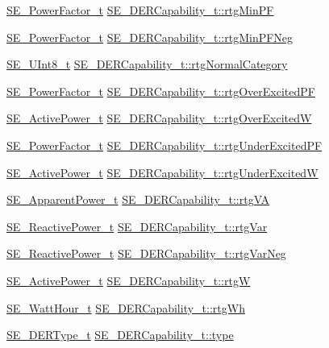 \begin{DoxyCompactItemize}
\item 
\hyperlink{structSE__PowerFactor__t}{S\+E\+\_\+\+Power\+Factor\+\_\+t} \hyperlink{group__DERCapability_ga72727afdb49427d03d3d113d0d2d6bf5}{S\+E\+\_\+\+D\+E\+R\+Capability\+\_\+t\+::rtg\+Min\+PF}
\item 
\hyperlink{structSE__PowerFactor__t}{S\+E\+\_\+\+Power\+Factor\+\_\+t} \hyperlink{group__DERCapability_gaebcb9b5c1b7df73c7b4eca49b090d6c3}{S\+E\+\_\+\+D\+E\+R\+Capability\+\_\+t\+::rtg\+Min\+P\+F\+Neg}
\item 
\hyperlink{group__UInt8_gaf7c365a1acfe204e3a67c16ed44572f5}{S\+E\+\_\+\+U\+Int8\+\_\+t} \hyperlink{group__DERCapability_gacc4601c0a325f5ddfc49dfb2d8505fe6}{S\+E\+\_\+\+D\+E\+R\+Capability\+\_\+t\+::rtg\+Normal\+Category}
\item 
\hyperlink{structSE__PowerFactor__t}{S\+E\+\_\+\+Power\+Factor\+\_\+t} \hyperlink{group__DERCapability_ga09cc0b98cc28ab8552ef88162516fc1f}{S\+E\+\_\+\+D\+E\+R\+Capability\+\_\+t\+::rtg\+Over\+Excited\+PF}
\item 
\hyperlink{structSE__ActivePower__t}{S\+E\+\_\+\+Active\+Power\+\_\+t} \hyperlink{group__DERCapability_gaf00b204426202867e4ed034f24913df1}{S\+E\+\_\+\+D\+E\+R\+Capability\+\_\+t\+::rtg\+Over\+ExcitedW}
\item 
\hyperlink{structSE__PowerFactor__t}{S\+E\+\_\+\+Power\+Factor\+\_\+t} \hyperlink{group__DERCapability_gafec88a7d239a508cf8179da9c92c860f}{S\+E\+\_\+\+D\+E\+R\+Capability\+\_\+t\+::rtg\+Under\+Excited\+PF}
\item 
\hyperlink{structSE__ActivePower__t}{S\+E\+\_\+\+Active\+Power\+\_\+t} \hyperlink{group__DERCapability_ga0b291049be0af4e289aea080f700b22c}{S\+E\+\_\+\+D\+E\+R\+Capability\+\_\+t\+::rtg\+Under\+ExcitedW}
\item 
\hyperlink{structSE__ApparentPower__t}{S\+E\+\_\+\+Apparent\+Power\+\_\+t} \hyperlink{group__DERCapability_gac861791e43780c5ca7f9994c31f59e86}{S\+E\+\_\+\+D\+E\+R\+Capability\+\_\+t\+::rtg\+VA}
\item 
\hyperlink{structSE__ReactivePower__t}{S\+E\+\_\+\+Reactive\+Power\+\_\+t} \hyperlink{group__DERCapability_ga626f569c239b41de4d007fddb01de132}{S\+E\+\_\+\+D\+E\+R\+Capability\+\_\+t\+::rtg\+Var}
\item 
\hyperlink{structSE__ReactivePower__t}{S\+E\+\_\+\+Reactive\+Power\+\_\+t} \hyperlink{group__DERCapability_ga3bbef4aacb8b26a315f24bb5a9b26deb}{S\+E\+\_\+\+D\+E\+R\+Capability\+\_\+t\+::rtg\+Var\+Neg}
\item 
\hyperlink{structSE__ActivePower__t}{S\+E\+\_\+\+Active\+Power\+\_\+t} \hyperlink{group__DERCapability_gabb04b932aebcf4b908bee4d1e9b81f13}{S\+E\+\_\+\+D\+E\+R\+Capability\+\_\+t\+::rtgW}
\item 
\hyperlink{structSE__WattHour__t}{S\+E\+\_\+\+Watt\+Hour\+\_\+t} \hyperlink{group__DERCapability_gad7168b19a76c0dc8b404801be524bff4}{S\+E\+\_\+\+D\+E\+R\+Capability\+\_\+t\+::rtg\+Wh}
\item 
\hyperlink{group__DERType_gad0e420a05951a4331fb39782b428852f}{S\+E\+\_\+\+D\+E\+R\+Type\+\_\+t} \hyperlink{group__DERCapability_ga50fcc4caf19115d8398da27622a972c1}{S\+E\+\_\+\+D\+E\+R\+Capability\+\_\+t\+::type}
\end{DoxyCompactItemize}


